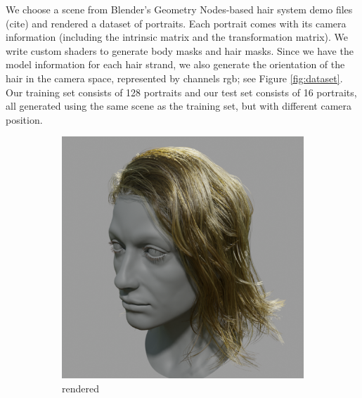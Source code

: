 \documentclass[12pt]{article}
\begin{document}
We choose a scene from Blender's Geometry Nodes-based hair system demo files (cite) and rendered a dataset of portraits. Each portrait comes with its camera information (including the intrinsic matrix and the transformation matrix). We write custom shaders to generate body masks and hair masks. Since we have the model information for each hair strand, we also generate the orientation of the hair in the camera space, represented by channels rgb; see Figure \ref{fig:dataset}. Our training set consists of 128 portraits and our test set consists of 16 portraits, all generated using the same scene as the training set, but with different camera position.
\begin{figure}[h]
	\centering
	\begin{subfigure}{0.24\textwidth}
		\centering
		\includegraphics[width=\textwidth]{./images/0009_rendered.png}
		\caption{rendered}
	\end{subfigure}
	\hfill
	\begin{subfigure}{0.24\textwidth}
		\centering

\end{subfigure}
\end{figure}
\end{document}
